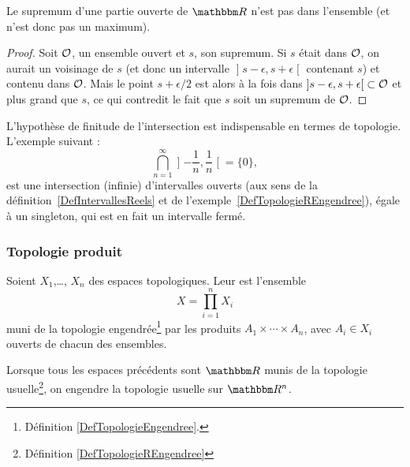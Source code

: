 \begin{lemma}  \label{LemSupOuvPas}
Le supremum d'une partie ouverte de \( \eR\) n'est pas dans l'ensemble (et n'est donc pas un maximum).
\end{lemma}

\begin{proof}
Soit $\mathcal{O}$, un ensemble ouvert et $s$, son supremum. Si $s$ était dans $\mathcal{O}$, on aurait un voisinage de $s$ (et donc un intervalle $\mathopen]s - \epsilon, s + \epsilon \mathclose[$ contenant $s$) et contenu dans $\mathcal{O}$. Mais le point $s+\epsilon/2$ est alors à la fois dans $\mathopen]s - \epsilon, s + \epsilon \mathclose[ \subset \mathcal{O}$ et plus grand que $s$, ce qui contredit le fait que $s$ soit un supremum de $\mathcal{O}$.
\end{proof}

\begin{remark}
  L'hypothèse de finitude de l'intersection est indispensable en termes de topologie. L'exemple suivant :
  \begin{equation}
    \bigcap_{n=1}^{\infty}\mathopen] -\frac{1}{ n } , \frac{1}{ n } \mathclose[ = \{ 0 \},
  \end{equation}
  est une intersection (infinie) d'intervalles ouverts (aux sens de la définition~\ref{DefIntervallesReels} et de l'exemple~\ref{DefTopologieREngendree}), égale à un singleton, qui est en fait un intervalle fermé.
\end{remark}


\subsubsection{Topologie produit}
\begin{definition}      \label{DefIINHooAAjTdY}
    Soient \( X_1\),\ldots, \( X_n\) des espaces topologiques. Leur  est l'ensemble
    \begin{equation}
        X=\prod_{i=1}^nX_i
    \end{equation}
    muni de la topologie engendrée\footnote{Définition \ref{DefTopologieEngendree}.} par les produits \(A_1\times \cdots\times A_n\), avec \( A_i\in X_i \) ouverts de chacun des ensembles.
\end{definition}


\begin{definition}\label{DefTopologieRn}
  Lorsque tous les espaces précédents sont \( \eR \) munis de la topologie usuelle\footnote{Définition \ref{DefTopologieREngendree}}, on engendre la topologie usuelle sur \( \eR^n\).
\end{definition}


